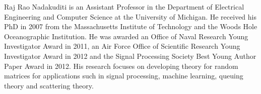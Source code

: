 \documentclass[10pt,twocolumn,twoside]{IEEEtran}
\begin{document}
\begin{biography}{Raj Rao Nadakuditi}
is an Assistant Professor in the Department of Electrical Engineering and Computer Science at the University of Michigan. He received his PhD in 2007 from the Massachusetts Institute of Technology and the Woods Hole Oceanographic Institution. He was awarded an Office of Naval Research Young Investigator Award in 2011, an Air Force Office of Scientific Research Young Investigator Award in 2012 and the Signal Processing Society Best Young Author Paper Award in 2012. His research focuses on developing theory for random matrices for applications such in signal processing, machine learning, queuing theory and scattering theory. 
\end{biography}






\end{document}
